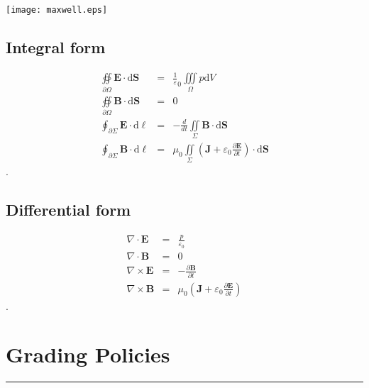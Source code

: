 \documentclass[letterpaper,10pt,titlepage,fleqn]{article}
\begin{document}
\centerline{\texttt{[image: maxwell.eps]}}
\subsection*{Integral form}

\begin{eqnarray}
 \oiint\limits_{\partial{\Omega}} \mathbf{E} \cdot \text{d} \mathbf{S} &=& \frac{1}{\varepsilon}_{0}\iiint\limits_{\Omega} p \text{d}V\\
\oiint\limits_{\partial{\Omega}} \mathbf{B} \cdot \text{d} \mathbf{S} &=& 0\\
 \oint _{\partial{\Sigma}} \mathbf{E} \cdot \text{d} \ell &=& - \frac{d}{dt} \iint \limits_{\Sigma} \mathbf{B} \cdot \text{d} \mathbf{S}\\
 \oint _{\partial{\Sigma}} \mathbf{B} \cdot \text{d} \ell &=& \mu_{0} \iint \limits_{\Sigma} (\mathbf{J}+\varepsilon_{0} \frac{\partial \mathbf{E}}{\partial t}) \cdot \text{d} \mathbf{S}
\end{eqnarray}.
\subsection*{Differential form}
\begin{eqnarray}
\nabla \cdot \mathbf{E} &=& \frac{p}{\varepsilon_{0}}\\
\nabla \cdot \mathbf{B} &=& 0\\
\nabla \times \mathbf{E} &=& -\frac{\partial{\mathbf{B}}}{\partial t}\\
\nabla \times \mathbf{B} &=& \mu_{0}(\mathbf{J}+\varepsilon_{0} \frac{\partial{\mathbf{E}}}{\partial t})
\end{eqnarray}.
\section*{Grading Policies}
\hrule
\end{document}
